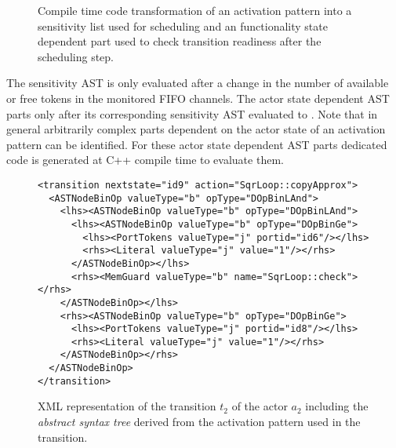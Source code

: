 \begin{figure}[h]
\centering
\resizebox{\columnwidth}{!}{}
%
\caption{\label{fig:ast-t2-sqrloop}\label{fig:ast-compile-time-transform}%
Compile time code transformation of an activation pattern into a sensitivity list used for scheduling and an functionality state dependent part used to check transition readiness after the scheduling step.
}
\end{figure}

The sensitivity AST is only evaluated after a change in the number of available or free tokens in the monitored FIFO channels.
The actor state dependent AST parts only after its corresponding sensitivity AST evaluated to .
Note that in general arbitrarily complex parts dependent on the actor state of an activation pattern can be identified.
For these actor state dependent AST parts dedicated code is generated at C++ compile time to evaluate them.

\begin{figure}[h]
\begin{verbatim}
<transition nextstate="id9" action="SqrLoop::copyApprox">
  <ASTNodeBinOp valueType="b" opType="DOpBinLAnd">
    <lhs><ASTNodeBinOp valueType="b" opType="DOpBinLAnd">
      <lhs><ASTNodeBinOp valueType="b" opType="DOpBinGe">
        <lhs><PortTokens valueType="j" portid="id6"/></lhs>
        <rhs><Literal valueType="j" value="1"/></rhs>
      </ASTNodeBinOp></lhs>
      <rhs><MemGuard valueType="b" name="SqrLoop::check"></rhs>
    </ASTNodeBinOp></lhs>
    <rhs><ASTNodeBinOp valueType="b" opType="DOpBinGe">
      <lhs><PortTokens valueType="j" portid="id8"/></lhs>
      <rhs><Literal valueType="j" value="1"/></rhs>
    </ASTNodeBinOp></rhs>
  </ASTNodeBinOp>
</transition>
\end{verbatim}
\caption{\label{fig:xml-t2-sqrloop}%
XML representation of the transition $t_2$ of the  actor $a_2$ including the \emph{abstract syntax tree} derived from the activation pattern used in the transition.
}
\end{figure}




